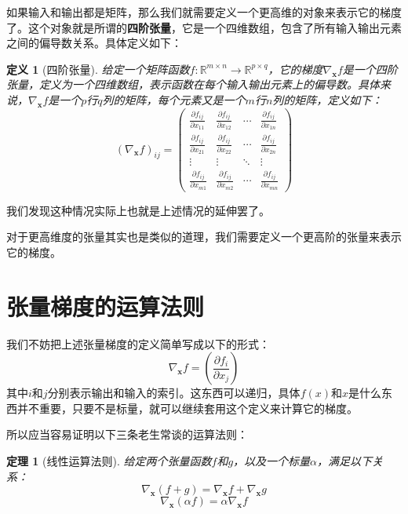 \documentclass[
    UTF8,
    a4paper,
    12pt
]{ctexart}
\newtheorem{definition}{定义}
\newtheorem{theorem}{定理}
\begin{document}
如果输入和输出都是矩阵，那么我们就需要定义一个更高维的对象来表示它的梯度了。这个对象就是所谓的\textbf{四阶张量}，它是一个四维数组，包含了所有输入输出元素之间的偏导数关系。具体定义如下：
\begin{definition}[四阶张量]
    给定一个矩阵函数$f: \mathbb{R}^{m \times n} \to \mathbb{R}^{p \times q}$，它的梯度$\nabla_\mathbf{x} f$是一个四阶张量，定义为一个四维数组，表示函数在每个输入输出元素上的偏导数。具体来说，$\nabla_\mathbf{x} f$是一个$p$行$q$列的矩阵，每个元素又是一个$m$行$n$列的矩阵，定义如下：
    \begin{equation}
        (\nabla_\mathbf{x} f)_{ij} = \begin{pmatrix}
            \frac{\partial f_{ij}}{\partial x_{11}} & \frac{\partial f_{ij}}{\partial x_{12}} & \cdots & \frac{\partial f_{ij}}{\partial x_{1n}} \\
            \frac{\partial f_{ij}}{\partial x_{21}} & \frac{\partial f_{ij}}{\partial x_{22}} & \cdots & \frac{\partial f_{ij}}{\partial x_{2n}} \\
            \vdots & \vdots & \ddots & \vdots \\
            \frac{\partial f_{ij}}{\partial x_{m1}} & \frac{\partial f_{ij}}{\partial x_{m2}} & \cdots & \frac{\partial f_{ij}}{\partial x_{mn}}
        \end{pmatrix}
    \end{equation}
\end{definition}

我们发现这种情况实际上也就是上述情况的延伸罢了。

对于更高维度的张量其实也是类似的道理，我们需要定义一个更高阶的张量来表示它的梯度。

\section{张量梯度的运算法则}

我们不妨把上述张量梯度的定义简单写成以下的形式：
\begin{equation}
    \nabla_\mathbf{x} f = \left( \frac{\partial f_i}{\partial x_j} \right)
\end{equation}
其中$i$和$j$分别表示输出和输入的索引。这东西可以递归，具体$f(x)$和$x$是什么东西并不重要，只要不是标量，就可以继续套用这个定义来计算它的梯度。

所以应当容易证明以下三条老生常谈的运算法则：
\begin{theorem}[线性运算法则]
    给定两个张量函数$f$和$g$，以及一个标量$\alpha$，满足以下关系：
    \begin{equation}
        \nabla_\mathbf{x} (f + g) = \nabla_\mathbf{x} f + \nabla_\mathbf{x} g
    \end{equation}
    \begin{equation}        
        \nabla_\mathbf{x} (\alpha f) = \alpha \nabla_\mathbf{x} f
    \end{equation}
\end{theorem}
\end{document}
